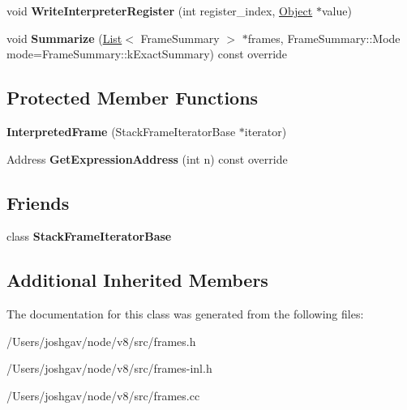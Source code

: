 \begin{DoxyCompactItemize}
\item 
void {\bfseries Write\+Interpreter\+Register} (int register\+\_\+index, \hyperlink{classv8_1_1internal_1_1_object}{Object} $\ast$value)\hypertarget{classv8_1_1internal_1_1_interpreted_frame_ae394bee44558113608123162a1b942fd}{}\label{classv8_1_1internal_1_1_interpreted_frame_ae394bee44558113608123162a1b942fd}

\item 
void {\bfseries Summarize} (\hyperlink{classv8_1_1internal_1_1_list}{List}$<$ Frame\+Summary $>$ $\ast$frames, Frame\+Summary\+::\+Mode mode=Frame\+Summary\+::k\+Exact\+Summary) const  override\hypertarget{classv8_1_1internal_1_1_interpreted_frame_af5311d62bb3ff813672ba88dae7c4fe3}{}\label{classv8_1_1internal_1_1_interpreted_frame_af5311d62bb3ff813672ba88dae7c4fe3}

\end{DoxyCompactItemize}
\subsection*{Protected Member Functions}
\begin{DoxyCompactItemize}
\item 
{\bfseries Interpreted\+Frame} (Stack\+Frame\+Iterator\+Base $\ast$iterator)\hypertarget{classv8_1_1internal_1_1_interpreted_frame_ab0e08279788deabbf22fc02bd884ef6a}{}\label{classv8_1_1internal_1_1_interpreted_frame_ab0e08279788deabbf22fc02bd884ef6a}

\item 
Address {\bfseries Get\+Expression\+Address} (int n) const  override\hypertarget{classv8_1_1internal_1_1_interpreted_frame_a26d36d07f3c059631db73db1f13f3648}{}\label{classv8_1_1internal_1_1_interpreted_frame_a26d36d07f3c059631db73db1f13f3648}

\end{DoxyCompactItemize}
\subsection*{Friends}
\begin{DoxyCompactItemize}
\item 
class {\bfseries Stack\+Frame\+Iterator\+Base}\hypertarget{classv8_1_1internal_1_1_interpreted_frame_ac7310421866976ca454bbe11c5f926c3}{}\label{classv8_1_1internal_1_1_interpreted_frame_ac7310421866976ca454bbe11c5f926c3}

\end{DoxyCompactItemize}
\subsection*{Additional Inherited Members}


The documentation for this class was generated from the following files\+:\begin{DoxyCompactItemize}
\item 
/\+Users/joshgav/node/v8/src/frames.\+h\item 
/\+Users/joshgav/node/v8/src/frames-\/inl.\+h\item 
/\+Users/joshgav/node/v8/src/frames.\+cc\end{DoxyCompactItemize}
